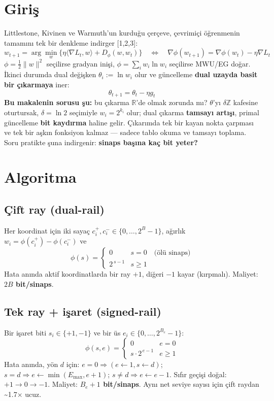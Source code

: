 \documentclass[11pt]{article}
\begin{document}
\section*{Giriş}
Littlestone, Kivinen ve Warmuth'un kurduğu çerçeve, çevrimiçi öğrenmenin tamamını tek bir denkleme indirger [1,2,3]:
\[w_{t+1} = \arg\min_{w}\Big\{\eta\langle\nabla L_t, w\rangle + D_\phi(w, w_t)\Big\} \quad\Longleftrightarrow\quad \nabla\phi(w_{t+1}) = \nabla\phi(w_t) - \eta\nabla L_t\]
$\phi=\tfrac12\|w\|^2$ seçilirse gradyan inişi, $\phi=\sum_i w_i\ln w_i$ seçilirse MWU/EG doğar. İkinci durumda dual değişken $\theta_i := \ln w_i$ olur ve güncelleme \textbf{dual uzayda basit bir çıkarmaya} iner:
\[\theta_{t+1} = \theta_t - \eta g_t\]
\textbf{Bu makalenin sorusu şu:} bu çıkarma $\mathbb{R}$'de olmak zorunda mı?
$\theta$'yı $\delta\mathbb{Z}$ kafesine oturtursak, $\delta=\ln 2$ seçimiyle $w_i = 2^{k_i}$ olur; dual çıkarma \textbf{tamsayı artışı}, primal güncelleme \textbf{bit kaydırma} haline gelir. Çıkarımda tek bir kayan nokta çarpması ve tek bir aşkın fonksiyon kalmaz — sadece tablo okuma ve tamsayı toplama.
Soru pratikte şuna indirgenir: \textbf{sinaps başına kaç bit yeter?}
\section*{Algoritma}
\subsection*{Çift ray (dual-rail)}
Her koordinat için iki sayaç $c^+_i, c^-_i \in \{0,\dots,2^B-1\}$, ağırlık $w_i = \phi(c^+_i) - \phi(c^-_i)$ ve
\[\phi(s) = \begin{cases}0 & s=0 \quad\text{(ölü sinaps)}\\ 2^{\,s-1} & s\ge 1\end{cases}\]
Hata anında aktif koordinatlarda bir ray $+1$, diğeri $-1$ kayar (kırpmalı). Maliyet: \textbf{$2B$ bit/sinaps}.
\subsection*{Tek ray + işaret (signed-rail)}
Bir işaret biti $s_i\in\{+1,-1\}$ ve bir üs $e_i\in\{0,\dots,2^{B_e}-1\}$:
\[\phi(s,e) = \begin{cases}0 & e=0\\ s\cdot 2^{\,e-1} & e\ge 1\end{cases}\]
Hata anında, yön $d$ için: $e{=}0 \Rightarrow (e{\leftarrow}1, s{\leftarrow}d)$; $s{=}d \Rightarrow e{\leftarrow}\min(E_{\max}, e{+}1)$; $s{\neq}d \Rightarrow e{\leftarrow}e{-}1$. Sıfır geçişi doğal: $+1 \to 0 \to -1$. Maliyet: \textbf{$B_e+1$ bit/sinaps}. Aynı net seviye sayısı için çift raydan \textasciitilde{}1.7× ucuz.
\end{document}

